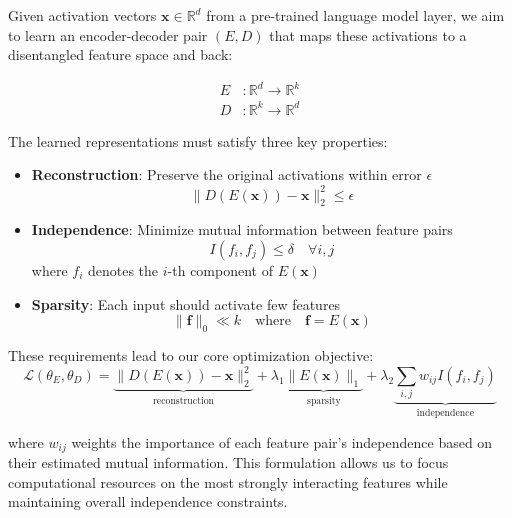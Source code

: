 \documentclass{article} %
\begin{document}
Given activation vectors $\mathbf{x} \in \mathbb{R}^d$ from a pre-trained language model layer, we aim to learn an encoder-decoder pair $(E, D)$ that maps these activations to a disentangled feature space and back:

\begin{align*}
E &: \mathbb{R}^d \rightarrow \mathbb{R}^k \\
D &: \mathbb{R}^k \rightarrow \mathbb{R}^d
\end{align*}

The learned representations must satisfy three key properties:

\begin{itemize}
    \item \textbf{Reconstruction}: Preserve the original activations within error $\epsilon$
    \begin{equation}
        \|D(E(\mathbf{x})) - \mathbf{x}\|_2^2 \leq \epsilon
    \end{equation}
    
    \item \textbf{Independence}: Minimize mutual information between feature pairs
    \begin{equation}
        I(f_i, f_j) \leq \delta \quad \forall i,j
    \end{equation}
    where $f_i$ denotes the $i$-th component of $E(\mathbf{x})$
    
    \item \textbf{Sparsity}: Each input should activate few features
    \begin{equation}
        \|\mathbf{f}\|_0 \ll k \quad \text{where} \quad \mathbf{f} = E(\mathbf{x})
    \end{equation}
\end{itemize}

These requirements lead to our core optimization objective:
\begin{equation}
    \mathcal{L}(\theta_E, \theta_D) = \underbrace{\|D(E(\mathbf{x})) - \mathbf{x}\|_2^2}_{\text{reconstruction}} + \lambda_1 \underbrace{\|E(\mathbf{x})\|_1}_{\text{sparsity}} + \lambda_2 \underbrace{\sum_{i,j} w_{ij} I(f_i, f_j)}_{\text{independence}}
\end{equation}

where $w_{ij}$ weights the importance of each feature pair's independence based on their estimated mutual information. This formulation allows us to focus computational resources on the most strongly interacting features while maintaining overall independence constraints.
\end{document}
